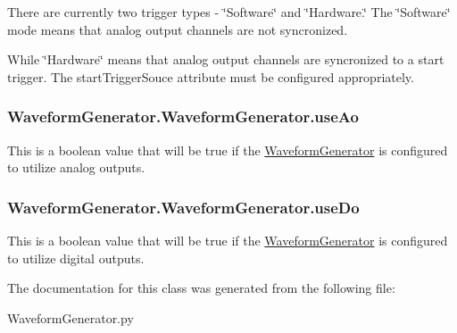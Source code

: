There are currently two trigger types -\/ \char`\"{}\-Software\char`\"{} and \char`\"{}\-Hardware.\char`\"{} The \char`\"{}\-Software\char`\"{} mode means that analog output channels are not syncronized. 

While \char`\"{}\-Hardware\char`\"{} means that analog output channels are syncronized to a start trigger. The start\-Trigger\-Souce attribute must be configured appropriately. \hypertarget{class_waveform_generator_1_1_waveform_generator_abd9a10ccc783ec4174a7ee9f8ab170ad}{
\subsubsection[{use\-Ao}]{\setlength{\rightskip}{0pt plus 5cm}Waveform\-Generator.\-Waveform\-Generator.\-use\-Ao}}\label{class_waveform_generator_1_1_waveform_generator_abd9a10ccc783ec4174a7ee9f8ab170ad}


This is a boolean value that will be true if the \hyperlink{class_waveform_generator_1_1_waveform_generator}{Waveform\-Generator} is configured to utilize analog outputs. 

\hypertarget{class_waveform_generator_1_1_waveform_generator_a68e8bdc6d3cf0b402502766186571d6f}{
\subsubsection[{use\-Do}]{\setlength{\rightskip}{0pt plus 5cm}Waveform\-Generator.\-Waveform\-Generator.\-use\-Do}}\label{class_waveform_generator_1_1_waveform_generator_a68e8bdc6d3cf0b402502766186571d6f}


This is a boolean value that will be true if the \hyperlink{class_waveform_generator_1_1_waveform_generator}{Waveform\-Generator} is configured to utilize digital outputs. 



The documentation for this class was generated from the following file\-:\begin{DoxyCompactItemize}
\item 
Waveform\-Generator.\-py\end{DoxyCompactItemize}

